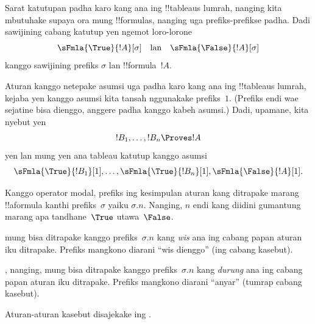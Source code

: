 \documentclass[../../../include/open-logic-section]{subfiles}
\begin{document}
Sarat katutupan padha karo kang ana ing !!{tableau}s lumrah, nanging
kita mbutuhake supaya ora mung !!{formula}s, nanging uga prefiks-prefikse
padha. Dadi sawijining cabang katutup yen ngemot loro-lorone
\[
\sFmla{\True}{!A}[\sigma] \quad\text{lan}\quad \sFmla{\False}{!A}[\sigma]
\]
kanggo sawijining prefiks $\sigma$ lan !!{formula}~$!A$.

Aturan kanggo netepake asumsi uga padha karo kang ana ing
!!{tableau}s lumrah, kejaba yen kanggo asumsi kita tansah nggunakake
prefiks~$1$. (Prefiks endi wae sejatine bisa dienggo, anggere padha
kanggo kabeh asumsi.) Dadi, upamane, kita nyebut yen
\[
!B_1, \dots, !B_n \Proves !A
\]
yen lan mung yen ana tableau katutup kanggo asumsi
\[
\sFmla{\True}{!B_1}[1], \dots, \sFmla{\True}{!B_n}[1],
\sFmla{\False}{!A}[1].
\]

Kanggo operator modal, prefiks ing
kesimpulan aturan kang ditrapake marang !!a{formula} kanthi
prefiks~$\sigma$ yaiku $\sigma.n$. Nanging, $n$ endi kang diidini
gumantung marang apa tandhane~$\True$ utawa~$\False$.

 mung
bisa ditrapake kanggo prefiks~$\sigma.n$ kang \emph{wis} ana ing
cabang papan aturan iku ditrapake. Prefiks mangkono diarani ``wis
dienggo'' (ing cabang kasebut).

,
nanging, mung bisa ditrapake kanggo prefiks~$\sigma.n$ kang
\emph{durung} ana ing cabang papan aturan iku ditrapake. Prefiks
mangkono diarani ``anyar'' (tumrap cabang kasebut).

Aturan-aturan kasebut disajekake ing .
\end{document}
